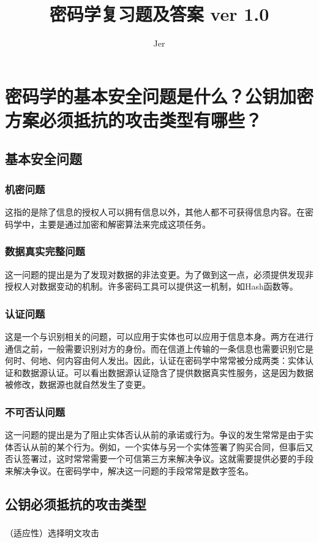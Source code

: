 \documentclass[11pt,a4paper]{article}
\title{密码学复习题及答案 ver 1.0}
\author{Jer}
\begin{document}
\maketitle

\section{密码学的基本安全问题是什么？公钥加密方案必须抵抗的攻击类型有哪些？}
\subsection{基本安全问题}
\subsubsection{机密问题}这指的是除了信息的授权人可以拥有信息以外，其他人都不可获得信息内容。在密码学中，主要是通过加密和解密算法来完成这项任务。
\subsubsection{数据真实完整问题}这一问题的提出是为了发现对数据的非法变更。为了做到这一点，必须提供发现非授权人对数据变动的机制。许多密码工具可以提供这一机制，如Hash函数等。
\subsubsection{认证问题}这是一个与识别相关的问题，可以应用于实体也可以应用于信息本身。两方在进行通信之前，一般需要识别对方的身份。而在信道上传输的一条信息也需要识别它是何时、何地、何内容由何人发出。因此，认证在密码学中常常被分成两类：实体认证和数据源认证。可以看出数据源认证隐含了提供数据真实性服务，这是因为数据被修改，数据源也就自然发生了变更。
\subsubsection{不可否认问题}这一问题的提出是为了阻止实体否认从前的承诺或行为。争议的发生常常是由于实体否认从前的某个行为。例如，一个实体与另一个实体签署了购买合同，但事后又否认签署过，这时常常需要一个可信第三方来解决争议。这就需要提供必要的手段来解决争议。在密码学中，解决这一问题的手段常常是数字签名。

\subsection{公钥必须抵抗的攻击类型}
\subsubsection{}（适应性）选择明文攻击
\end{document}
